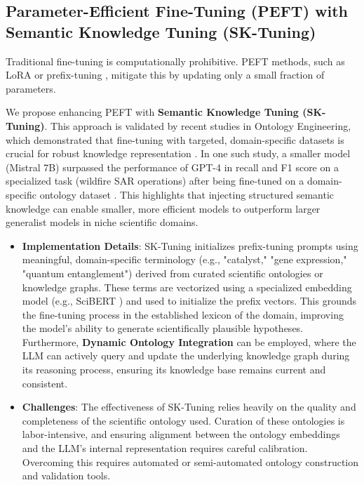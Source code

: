 \documentclass{article}
\begin{document}
\subsection{Parameter-Efficient Fine-Tuning (PEFT) with Semantic Knowledge Tuning (SK-Tuning)}
Traditional fine-tuning is computationally prohibitive. PEFT methods, such as LoRA \cite{hu2021lora} or prefix-tuning \cite{li2020prefix}, mitigate this by updating only a small fraction of parameters.

We propose enhancing PEFT with \textbf{Semantic Knowledge Tuning (SK-Tuning)}. This approach is validated by recent studies in Ontology Engineering, which demonstrated that fine-tuning with targeted, domain-specific datasets is crucial for robust knowledge representation \cite{boubdir2025enhancing}. In one such study, a smaller model (Mistral 7B) surpassed the performance of GPT-4 in recall and F1 score on a specialized task (wildfire SAR operations) after being fine-tuned on a domain-specific ontology dataset \cite{boubdir2025enhancing}. This highlights that injecting structured semantic knowledge can enable smaller, more efficient models to outperform larger generalist models in niche scientific domains.

\begin{itemize}
    \item \textbf{Implementation Details}: SK-Tuning initializes prefix-tuning prompts using meaningful, domain-specific terminology (e.g., "catalyst," "gene expression," "quantum entanglement") derived from curated scientific ontologies or knowledge graphs. These terms are vectorized using a specialized embedding model (e.g., SciBERT \cite{beltagy2019scibert}) and used to initialize the prefix vectors. This grounds the fine-tuning process in the established lexicon of the domain, improving the model's ability to generate scientifically plausible hypotheses. Furthermore, \textbf{Dynamic Ontology Integration} can be employed, where the LLM can actively query and update the underlying knowledge graph during its reasoning process, ensuring its knowledge base remains current and consistent.
    \item \textbf{Challenges}: The effectiveness of SK-Tuning relies heavily on the quality and completeness of the scientific ontology used. Curation of these ontologies is labor-intensive, and ensuring alignment between the ontology embeddings and the LLM's internal representation requires careful calibration. Overcoming this requires automated or semi-automated ontology construction and validation tools.
\end{itemize}
\end{document}
